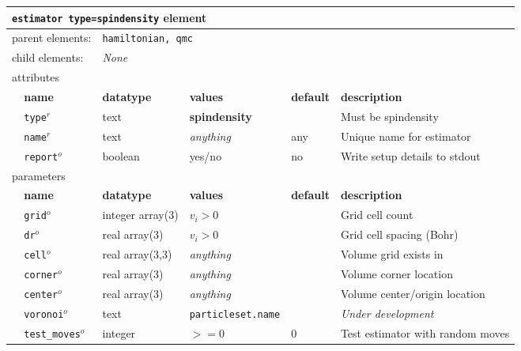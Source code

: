 \FloatBarrier
\begin{table}[h]
\begin{center}
\begin{tabularx}{\textwidth}{l l l l l l }
\hline
\multicolumn{6}{l}{\texttt{estimator type=spindensity} element} \\
\hline
\multicolumn{2}{l}{parent elements:} & \multicolumn{4}{l}{\texttt{hamiltonian, qmc}}\\
\multicolumn{2}{l}{child  elements:} & \multicolumn{4}{l}{\textit{None}}\\
\multicolumn{2}{l}{attributes}  & \multicolumn{4}{l}{}\\
   & \bfseries name       & \bfseries datatype & \bfseries values  & \bfseries default   & \bfseries description \\
   & \texttt{type}$^r$    &  text              & \textbf{spindensity} &                  & Must be spindensity       \\
   & \texttt{name}$^r$    &  text              & \textit{anything}    & any              & Unique name for estimator \\
   & \texttt{report}$^o$  &  boolean           & yes/no               & no               & Write setup details to stdout \\
\multicolumn{2}{l}{parameters}  & \multicolumn{4}{l}{}\\
   & \bfseries name       & \bfseries datatype & \bfseries values  & \bfseries default   & \bfseries description \\
   & \texttt{grid}$^o$      & integer array(3) & $v_i>0$           &                     & Grid cell count       \\
   & \texttt{dr}$^o$        & real array(3)    & $v_i>0$           &                     & Grid cell spacing (Bohr) \\
   & \texttt{cell}$^o$      & real array(3,3)  & \textit{anything} &                     & Volume grid exists in           \\
   & \texttt{corner}$^o$    & real array(3)    & \textit{anything} &                     & Volume corner location  \\
   & \texttt{center}$^o$    & real array(3)    & \textit{anything} &                     & Volume center/origin location \\
   & \texttt{voronoi}$^o$   & text             &\texttt{particleset.name}&               & \textit{Under development}\\%
   & \texttt{test\_moves}$^o$& integer         & $>=0$             & 0                   & Test estimator with random moves  \\
  \hline
\end{tabularx}
\end{center}
\end{table}
\FloatBarrier


